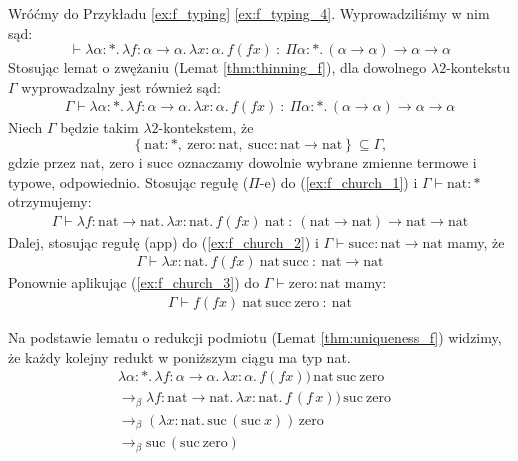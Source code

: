  \begin{przyklad}
    Wróćmy do Przykładu \ref{ex:f_typing} \ref{ex:f_typing_4}. Wyprowadziliśmy w nim sąd:
    \[\vdash\lambda \alpha : * .\, \lambda f : \alpha \to \alpha .\, \lambda x : \alpha .\, f (f x)\ :\ \Pi \alpha : * .\, (\alpha \to \alpha) \to \alpha \to \alpha\]
    Stosując lemat o zwężaniu (Lemat \ref{thm:thinning_f}), dla dowolnego \(\lambda 2\)-kontekstu \(\Gamma\) wyprowadzalny jest również sąd:
    \begin{align}
      \Gamma\vdash\lambda \alpha : * .\, \lambda f : \alpha \to \alpha .\, \lambda x : \alpha .\, f (f x)\ :\ \Pi \alpha : * .\, (\alpha \to \alpha) \to \alpha \to \alpha\tag{1}\label{ex:f_church_1}
    \end{align}
    Niech \(\Gamma\) będzie takim \(\lambda 2\)-kontekstem, że 
    \[\left\{
      \mathrm{nat}:*,\ 
      \mathrm{zero}:\mathrm{nat},\ 
      \mathrm{succ}:\mathrm{nat}\to\mathrm{nat}
    \right\} \subseteq \Gamma,
    \]
    gdzie przez nat, zero i succ oznaczamy dowolnie wybrane zmienne termowe i typowe, odpowiednio.
    Stosując regułę (\(\Pi\)-e) do (\ref{ex:f_church_1}) i \(\Gamma\vdash \mathrm{nat}:*\) otrzymujemy:
    \begin{align}
      \Gamma\vdash\lambda f : \mathrm{nat} \to \mathrm{nat}.\, \lambda x : \mathrm{nat}.\, f (f x)\ \mathrm{nat}\ :\ (\mathrm{nat} \to \mathrm{nat}) \to \mathrm{nat} \to \mathrm{nat}\tag{2}\label{ex:f_church_2}
    \end{align}
    Dalej, stosując regułę (app) do (\ref{ex:f_church_2}) i \(\Gamma\vdash \mathrm{succ}:\mathrm{nat}\to\mathrm{nat}\) mamy, że
    \begin{align}
      \Gamma \vdash \lambda x : \mathrm{nat}.\, f (f x)\ \mathrm{nat}\ \mathrm{succ}\ :\ \mathrm{nat} \to \mathrm{nat}\tag{3}\label{ex:f_church_3}
    \end{align}
    Ponownie aplikując (\ref{ex:f_church_3}) do \(\Gamma\vdash \mathrm{zero}:\mathrm{nat}\) mamy:
    \begin{align}
      \Gamma \vdash f (f x)\ \mathrm{nat}\ \mathrm{succ}\ \mathrm{zero}\ :\ \mathrm{nat} \tag{4}\label{ex:f_church_4}
    \end{align}

    Na podstawie lematu o redukcji podmiotu (Lemat \ref{thm:uniqueness_f}) widzimy, że każdy kolejny redukt w poniższym ciągu ma typ nat. 
    \begin{align*}
      \lambda \alpha : *.\,\lambda f:\alpha\to\alpha.\,\lambda x:\alpha.\,f(f x))\,\mathrm{nat\  suc\  zero}\\
      \to_\beta\lambda f : \mathrm{nat}\to\mathrm{nat}.\,\lambda x :\mathrm{nat} .\, f\,(f\,x))\, \mathrm{suc\  zero}\\
      \to_\beta(\lambda x:\mathrm{nat}.\,\mathrm{suc}\,(\mathrm{suc}\ x))\,\mathrm{zero} \\
      \to_\beta\mathrm{suc}\,(\mathrm{suc}\ \mathrm{zero})&
    \end{align*}
  \end{przyklad}

